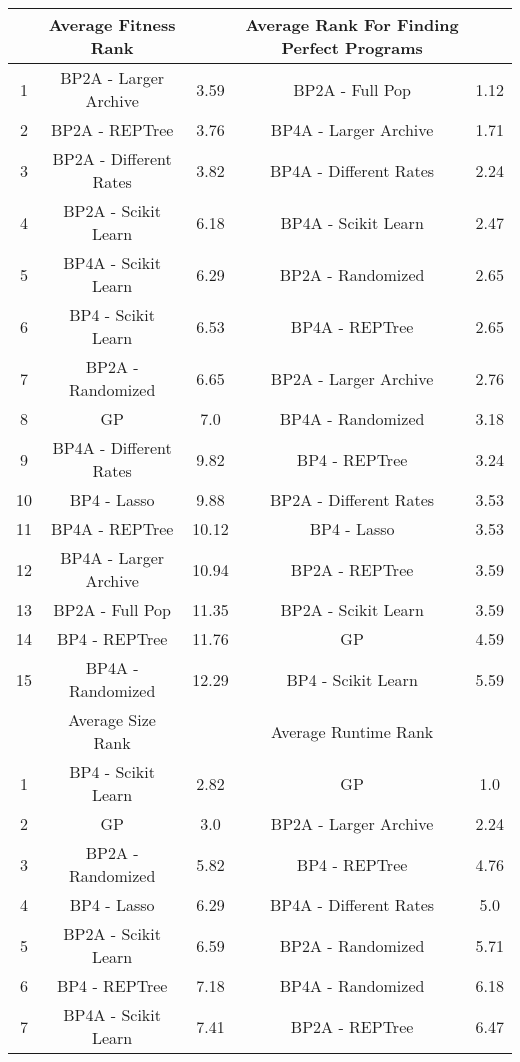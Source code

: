 \begin{table*}[ht]
\centering
\begin{adjustbox}{width=1\textwidth}
\small
\begin{tabular}{ c | c c | c c }
\hline\hline
& Average Fitness Rank & & Average Rank For Finding Perfect Programs & \\
\hline
1 & BP2A - Larger Archive & 3.59 & BP2A - Full Pop & 1.12 \\
2 & BP2A - REPTree & 3.76 & BP4A - Larger Archive & 1.71 \\
3 & BP2A - Different Rates & 3.82 & BP4A - Different Rates & 2.24 \\
4 & BP2A - Scikit Learn & 6.18 & BP4A - Scikit Learn & 2.47 \\
5 & BP4A - Scikit Learn & 6.29 & BP2A - Randomized & 2.65 \\
6 & BP4 - Scikit Learn & 6.53 & BP4A - REPTree & 2.65 \\
7 & BP2A - Randomized & 6.65 & BP2A - Larger Archive & 2.76 \\
8 & GP & 7.0 & BP4A - Randomized & 3.18 \\
9 & BP4A - Different Rates & 9.82 & BP4 - REPTree & 3.24 \\
10 & BP4 - Lasso & 9.88 & BP2A - Different Rates & 3.53 \\
11 & BP4A - REPTree & 10.12 & BP4 - Lasso & 3.53 \\
12 & BP4A - Larger Archive & 10.94 & BP2A - REPTree & 3.59 \\
13 & BP2A - Full Pop & 11.35 & BP2A - Scikit Learn & 3.59 \\
14 & BP4 - REPTree & 11.76 & GP & 4.59 \\
15 & BP4A - Randomized & 12.29 & BP4 - Scikit Learn & 5.59 \\
\hline\hline
& Average Size Rank & & Average Runtime Rank & \\
 \hline
1 & BP4 - Scikit Learn & 2.82 & GP & 1.0 \\
2 & GP & 3.0 & BP2A - Larger Archive & 2.24 \\
3 & BP2A - Randomized & 5.82 & BP4 - REPTree & 4.76 \\
4 & BP4 - Lasso & 6.29 & BP4A - Different Rates & 5.0 \\
5 & BP2A - Scikit Learn & 6.59 & BP2A - Randomized & 5.71 \\
6 & BP4 - REPTree & 7.18 & BP4A - Randomized & 6.18 \\
7 & BP4A - Scikit Learn & 7.41 & BP2A - REPTree & 6.47 \\

\end{tabular}
\end{adjustbox}
\end{table*}
